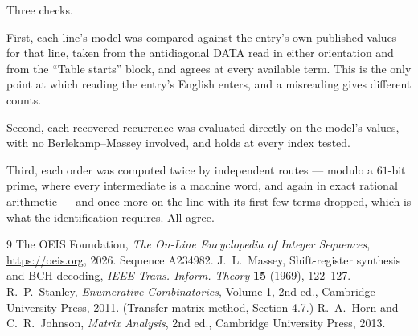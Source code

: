 \documentclass[11pt,a4paper]{article}
\theoremstyle{plain}
\theoremstyle{definition}
\begin{document}
Three checks.

First, each line's model was compared against the entry's own published values for that line,
taken from the antidiagonal DATA read in either orientation and from the ``Table starts''
block, and agrees at every available term. This is the only point at which reading the entry's
English enters, and a misreading gives different counts.

Second, each recovered recurrence was evaluated directly on the model's values, with no
Berlekamp--Massey involved, and holds at every index tested.

Third, each order was computed twice by independent routes --- modulo a $61$-bit prime, where
every intermediate is a machine word, and again in exact rational arithmetic --- and once more
on the line with its first few terms dropped, which is what the identification requires. All
agree.

\begin{thebibliography}{9}
 The OEIS Foundation, \emph{The On-Line Encyclopedia of Integer
Sequences}, \url{https://oeis.org}, 2026. Sequence A234982.
 J.~L.~Massey, Shift-register synthesis and BCH decoding, \emph{IEEE
Trans. Inform. Theory} \textbf{15} (1969), 122--127.
 R.~P.~Stanley, \emph{Enumerative Combinatorics}, Volume 1, 2nd ed.,
Cambridge University Press, 2011. (Transfer-matrix method, Section 4.7.)
 R.~A.~Horn and C.~R.~Johnson, \emph{Matrix Analysis}, 2nd ed., Cambridge
University Press, 2013.
\end{thebibliography}
\end{document}
